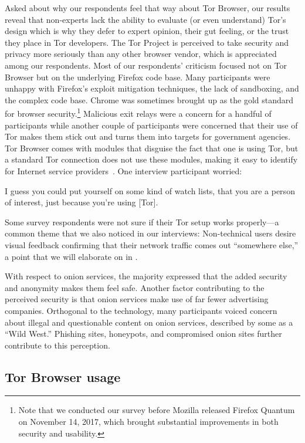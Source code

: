 Asked about why our respondents feel that way about Tor Browser, our results
reveal that non-experts lack the ability to evaluate (or even understand) Tor's
design which is why they defer to expert opinion, their gut feeling, or the
trust they place in Tor developers.  The Tor Project is perceived to take
security and privacy more seriously than any other browser vendor, which is
appreciated among our respondents.  Most of our respondents' criticism focused
not on Tor Browser but on the underlying Firefox code base.  Many participants
were unhappy with Firefox's exploit mitigation techniques, the lack of
sandboxing, and the complex code base.  Chrome was sometimes brought up as the
gold standard for browser security.\footnote{Note that we conducted our survey
before Mozilla released Firefox Quantum on November 14, 2017, which brought
substantial improvements in both security and usability.}  Malicious exit relays
were a concern for a handful of participants while another couple of
participants were concerned that their use of Tor makes them stick out and turns 
them into targets for government agencies.  Tor Browser comes with modules that
disguise the fact that one is using Tor, but a standard Tor connection does not
use these modules, making it easy to identify for Internet service
providers~\cite{pluggable}.  One interview participant worried:

\begin{displayquote}[P03]
I guess you could put yourself on some kind of watch lists, that you are a
person of interest, just because you're using [Tor].
\end{displayquote}

Some survey respondents were not sure if their Tor setup works properly---a
common theme that we also noticed in our interviews: Non-technical users desire
visual feedback confirming that their network traffic comes out ``somewhere
else,'' a point that we will elaborate on in .

With respect to onion services, the majority expressed that the added security
and anonymity makes them feel safe.  Another factor contributing to the
perceived security is that onion services make use of far fewer advertising
companies.  Orthogonal to the technology, many participants voiced concern about
illegal and questionable content on onion services, described by some as a
``Wild West.''  Phishing sites, honeypots, and compromised onion sites further
contribute to this perception.

\subsection{Tor Browser usage}

